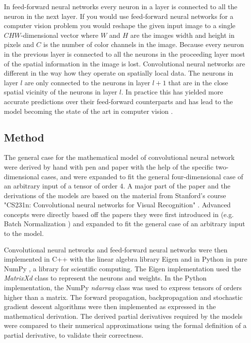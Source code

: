 \documentclass[a4paper, twoside]{article}
\begin{document}
In feed-forward neural networks every neuron in a layer is connected to all the neuron in the next layer. If you would use feed-forward neural networks for a computer vision problem you would reshape the given input image to a single $CHW$-dimensional vector where $W$ and $H$ are the images width and height in pixels and $C$ is the number of color channels in the image. Because every neuron in the previous layer is connected to all the neurons in the proceeding layer most of the spatial information in the image is lost. Convolutional neural networks are different in the way how they operate on spatially local data. The neurons in layer $l$ are only connected to the neurons in layer $l+1$ that are in the close spatial vicinity of the neurons in layer $l$. In practice this has yielded more accurate predictions over their feed-forward counterparts and has lead to the model becoming the state of the art in computer vision \cite{cs231n} \cite{convmath} \cite{convarithmetic}.
\subsection{Method}
The general case for the mathematical model of convolutional neural network were derived by hand with pen and paper with the help of the specific two-dimensional cases, and were expanded to fit the general four-dimensional case of an arbitrary input of a tensor of order 4. A major part of the paper and the derivations of the models are based on the material from Stanford's course "CS231n: Convolutional neural networks for Visual Recognition" \cite{cs231n}. Advanced concepts were directly based off the papers they were first introduced in (e.g. Batch Normalization \cite{batchnorm}) and expanded to fit the general case of an arbitrary input to the model. 

Convolutional neural networks and feed-forward neural networks were then implemented in C++ with the linear algebra library Eigen \cite{eigen} and in Python in pure NumPy \cite{numpy}, a library for scientific computing. The Eigen implementation used the \textit{MatrixXd} class to represent the neurons and weights. In the Python implementation, the NumPy \textit{ndarray} class was used to express tensors of orders higher than a matrix. The forward propagation, backpropagation and stochastic gradient descent algorithms were then implemented as expressed in the mathematical derivation. The derived partial derivatives required by the models were compared to their numerical approximations using the formal definition of a partial derivative, to validate their correctness. 
\end{document}
